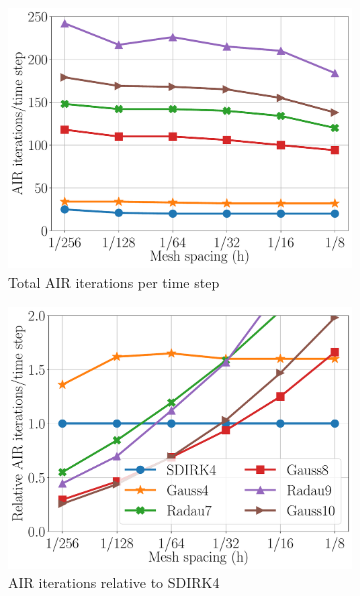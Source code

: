 \documentclass[review]{siamart}
\begin{document}
%
\begin{figure}[!h]
  \centering
  \begin{subfigure}[b]{0.475\textwidth}
    \includegraphics[width=\textwidth]{./figures/dg_advdiff_o4_1e-6.pdf}
    \caption{Total AIR iterations per time step}
	\label{fig:dg_o4_abs}
  \end{subfigure}
   \begin{subfigure}[b]{0.475\textwidth}
    \includegraphics[width=\textwidth]{./figures/dg_advdiff_o4_1e-6_rel.pdf}
   \caption{AIR iterations relative to SDIRK4}
	\label{fig:dg_o4_rel}
  \end{subfigure}
\caption{}
  \label{fig:dg_o4}
\end{figure}
%
\end{document}
